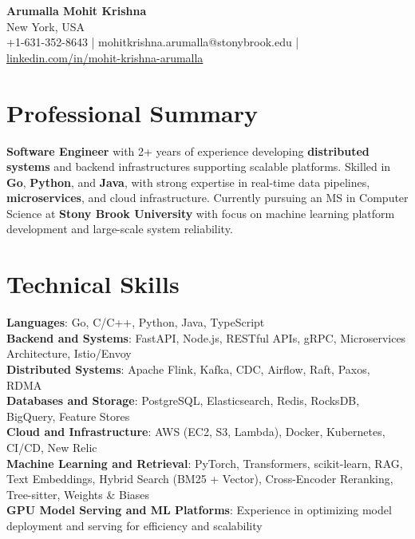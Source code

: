 \documentclass[letterpaper,11pt]{article}
\begin{document}
\begin{center}
  {\Large \textbf{Arumalla Mohit Krishna}} \\
  New York, USA \\
  +1-631-352-8643 \enspace | \enspace mohitkrishna.arumalla@stonybrook.edu \enspace | \enspace \href{https://www.linkedin.com/in/mohit-krishna-arumalla}{linkedin.com/in/mohit-krishna-arumalla}
\end{center}

\section{Professional Summary}
  \begin{itemize}[leftmargin=0.15in, label={}]
    \small{\item{
     \textbf{Software Engineer} with 2+ years of experience developing \textbf{distributed systems} and backend infrastructures supporting scalable platforms. Skilled in \textbf{Go}, \textbf{Python}, and \textbf{Java}, with strong expertise in real-time data pipelines, \textbf{microservices}, and cloud infrastructure. Currently pursuing an MS in Computer Science at \textbf{Stony Brook University} with focus on machine learning platform development and large-scale system reliability.
    }}
  \end{itemize}
\vspace{-16pt}

\section{Technical Skills}
 \begin{itemize}[leftmargin=0.15in, label={}]
    \small{\item{
     \textbf{Languages}: Go, C/C++, Python, Java, TypeScript \\
     \textbf{Backend and Systems}: FastAPI, Node.js, RESTful APIs, gRPC, Microservices Architecture, Istio/Envoy \\
     \textbf{Distributed Systems}: Apache Flink, Kafka, CDC, Airflow, Raft, Paxos, RDMA \\
     \textbf{Databases and Storage}: PostgreSQL, Elasticsearch, Redis, RocksDB, BigQuery, Feature Stores \\
     \textbf{Cloud and Infrastructure}: AWS (EC2, S3, Lambda), Docker, Kubernetes, CI/CD, New Relic \\
     \textbf{Machine Learning and Retrieval}: PyTorch, Transformers, scikit-learn, RAG, Text Embeddings, Hybrid Search (BM25 + Vector), Cross-Encoder Reranking, Tree-sitter, Weights \& Biases \\
     \textbf{GPU Model Serving and ML Platforms}: Experience in optimizing model deployment and serving for efficiency and scalability
    }}
 \end{itemize}
\vspace{-16pt}
\end{document}
